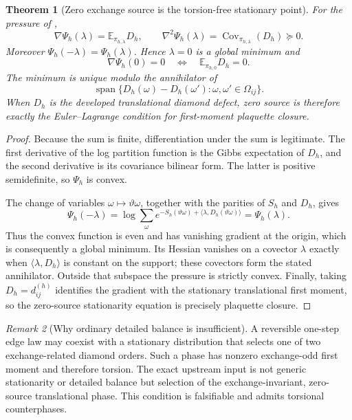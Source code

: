 \documentclass[11pt]{article}
\newtheorem{theorem}{Theorem}[section]
\theoremstyle{definition}
\theoremstyle{remark}
\newtheorem{remark}[theorem]{Remark}
\newcommand{\Span}{\operatorname{span}}
\begin{document}
\begin{theorem}[Zero exchange source is the torsion-free stationary point]
\label{thm:exchange-pressure-stationarity}
For the pressure of ,
\[
 \nabla\Psi_h(\lambda)
 =\mathbb E_{\pi_{h,\lambda}}D_h,
 \qquad
 \nabla^2\Psi_h(\lambda)
 =\operatorname{Cov}_{\pi_{h,\lambda}}(D_h)\succeq0.
\]
Moreover $\Psi_h(-\lambda)=\Psi_h(\lambda)$.  Hence $\lambda=0$ is a global
minimum and
\[
 \nabla\Psi_h(0)=0
 \quad\Longleftrightarrow\quad
 \mathbb E_{\pi_{h,0}}D_h=0.
\]
The minimum is unique modulo the annihilator of
\[
 \Span\{D_h(\omega)-D_h(\omega'):\omega,\omega'\in\Omega_{ij}\}.
\]
When $D_h$ is the developed translational diamond defect, zero source is
therefore exactly the Euler--Lagrange condition for first-moment plaquette
closure.
\end{theorem}

\begin{proof}
Because the sum is finite, differentiation under the sum is legitimate.  The
first derivative of the log partition function is the Gibbs expectation of
$D_h$, and the second derivative is its covariance bilinear form.  The latter is
positive semidefinite, so $\Psi_h$ is convex.

The change of variables $\omega\mapsto\vartheta\omega$, together with the
parities of $S_h$ and $D_h$, gives
\[
 \Psi_h(-\lambda)
 =\log\sum_\omega
 e^{-S_h(\vartheta\omega)+\langle\lambda,D_h(\vartheta\omega)\rangle}
 =\Psi_h(\lambda).
\]
Thus the convex function is even and has vanishing gradient at the origin,
which is consequently a global minimum.  Its Hessian vanishes on a covector
$\lambda$ exactly when $\langle\lambda,D_h\rangle$ is constant on the support;
these covectors form the stated annihilator.  Outside that subspace the pressure
is strictly convex.  Finally, taking $D_h=d_{ij}^{(h)}$ identifies the gradient
with the stationary translational first moment, so the zero-source stationarity
equation is precisely plaquette closure.
\end{proof}

\begin{remark}[Why ordinary detailed balance is insufficient]
A reversible one-step edge law may coexist with a stationary distribution that
selects one of two exchange-related diamond orders.  Such a phase has nonzero
exchange-odd first moment and therefore torsion.  The exact upstream input is
not generic stationarity or detailed balance but selection of the
exchange-invariant, zero-source translational phase.  This condition is
falsifiable and admits torsional counterphases.
\end{remark}
\end{document}
